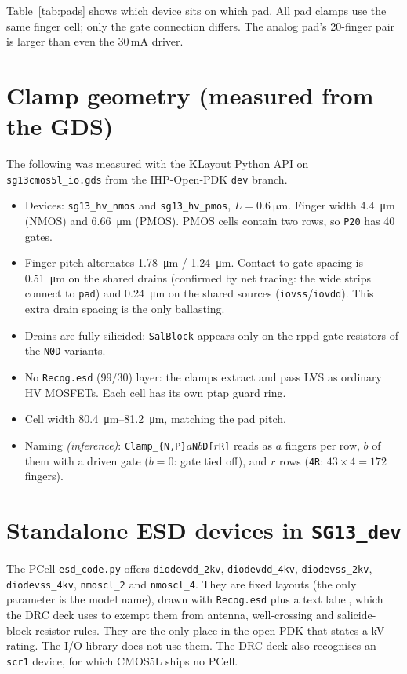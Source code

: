 \documentclass[11pt,a4paper]{article}
\newcommand{\cell}[1]{\texttt{#1}}
\begin{document}
Table~\ref{tab:pads} shows which device sits on which pad. All pad clamps use the same finger cell; only the gate connection differs.
The analog pad's 20-finger pair is larger than even the 30\,mA driver.

\section{Clamp geometry (measured from the GDS)}

The following was measured with the KLayout Python API on
\cell{sg13cmos5l\_io.gds} from the IHP-Open-PDK \cell{dev} branch.
\begin{itemize}
  \item Devices: \cell{sg13\_hv\_nmos} and \cell{sg13\_hv\_pmos}, $L=\SI{0.6}{\micro\metre}$.
        Finger width \SI{4.4}{\micro\metre} (NMOS) and \SI{6.66}{\micro\metre} (PMOS).
        PMOS cells contain two rows, so \cell{P20} has 40 gates.
  \item Finger pitch alternates \SI{1.78}{\micro\metre} / \SI{1.24}{\micro\metre}.
        Contact-to-gate spacing is \SI{0.51}{\micro\metre} on the shared drains
        (confirmed by net tracing: the wide strips connect to \cell{pad}) and
        \SI{0.24}{\micro\metre} on the shared sources (\cell{iovss}/\cell{iovdd}).
        This extra drain spacing is the only ballasting.
  \item Drains are fully silicided: \cell{SalBlock} appears only on the rppd
        gate resistors of the \cell{N0D} variants.
  \item No \cell{Recog.esd} (99/30) layer: the clamps extract and pass LVS as
        ordinary HV MOSFETs. Each cell has its own ptap guard ring.
  \item Cell width \SIrange{80.4}{81.2}{\micro\metre}, matching the pad pitch.
  \item Naming \emph{(inference)}: \cell{Clamp\_\{N,P\}$a$N$b$D[$r$R]} reads as
        $a$ fingers per row, $b$ of them with a driven gate ($b=0$: gate tied
        off), and $r$ rows (\cell{4R}: $43\times4=172$ fingers).
\end{itemize}

\section{Standalone ESD devices in \cell{SG13\_dev}}

The PCell \cell{esd\_code.py} offers \cell{diodevdd\_2kv}, \cell{diodevdd\_4kv},
\cell{diodevss\_2kv}, \cell{diodevss\_4kv}, \cell{nmoscl\_2} and \cell{nmoscl\_4}.
They are fixed layouts (the only parameter is the model name), drawn with
\cell{Recog.esd} plus a text label, which the DRC deck uses to exempt them from
antenna, well-crossing and salicide-block-resistor rules. They are the only
place in the open PDK that states a kV rating. The I/O library does not use
them. The DRC deck also recognises an \cell{scr1} device, for which CMOS5L ships
no PCell.
\end{document}
